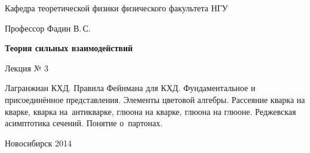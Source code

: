 \documentclass[12pt,pagesize,paper=192mm:108mm]{scrbook}
\begin{document}
\begin{titlepage}
\begin{center}
    Кафедра теоретической физики физического факультета НГУ
    \medskip

    \Large
    Профессор Фадин В.\,С.

    \huge
    \textbf{Теория сильных взаимодействий}
    \smallskip

    \Large
    Лекция № 3
    \vfill

    \normalsize
    \begin{minipage}{0.68\linewidth}
      Лагранжиан КХД. Правила Фейнмана для КХД. Фундаментальное и
      присоединённое представления. Элементы цветовой
      алгебры. Рассеяние кварка на кварке, кварка на~антикварке,
      глюона на кварке, глюона на глюоне. Реджевская асимптотика
      сечений. Понятие о~партонах.
    \end{minipage}
    \vfill

    \normalsize \ccbysa\hspace{0.5em} Новосибирск 2014
  \end{center}
\end{titlepage}
\end{document}
